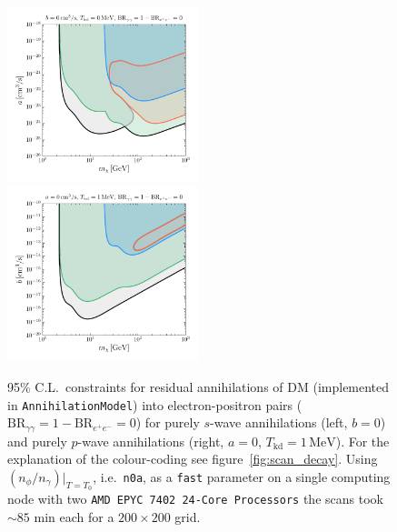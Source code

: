 \documentclass[11pt,a4paper]{article}
\begin{document}
\begin{figure}
	\centering
	\includegraphics[width=0.495\textwidth]{plots/annih_swave.pdf}
	\includegraphics[width=0.495\textwidth]{plots/annih_pwave_1MeV.pdf}
	\caption{95\% C.L.\ constraints for residual annihilations of DM (implemented in \texttt{AnnihilationModel}) into electron-positron pairs ($\text{BR}_{\gamma \gamma} = 1 - \text{BR}_{e^+ e^-} = 0$) for purely $s$-wave annihilations (left, $b = 0$) and purely $p$-wave annihilations (right, $a = 0$, $T_\mathrm{kd} = 1 \, \mathrm{MeV}$). For the explanation of the colour-coding see figure~\ref{fig:scan_decay}. Using $(n_\phi/n_\gamma)|_{T=T_0}$, i.e.\ \texttt{n0a}, as a \texttt{fast} parameter on a single computing node with two \texttt{AMD EPYC 7402 24-Core Processors} the scans took $\sim 85$ min each for a $200 \times 200$ grid.}
	\label{fig:scan_annih}
\end{figure}
\end{document}
